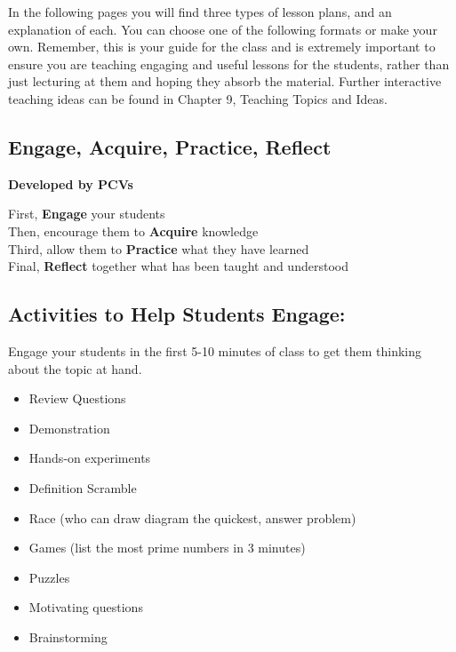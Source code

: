 In the following pages you will find three types of lesson plans, and an explanation of each.  You can choose one of the following formats or make your own.  Remember, this is your guide for the class and is extremely important to ensure you are teaching engaging and useful lessons for the students, rather than just lecturing at them and hoping they absorb the material.  Further interactive teaching ideas can be found in Chapter 9, Teaching Topics and Ideas.


\newpage

\begin{center}
\section{Engage, Acquire, Practice, Reflect}
\textbf{Developed by PCVs} \\
\end{center}

\begin{flushleft}
First, \textbf{Engage} your students \\
Then, encourage them to \textbf{Acquire} knowledge \\
Third, allow them to \textbf{Practice} what they have learned \\
Final, \textbf{Reflect} together what has been taught and understood \\
\end{flushleft}

\subsection{Activities to Help Students Engage:}
Engage your students in the first 5-10 minutes of class to get them thinking about the topic at hand.
\begin{itemize}
 \item Review Questions
 \item Demonstration
 \item Hands-on experiments
 \item Definition Scramble
 \item Race (who can draw diagram the quickest, answer problem)
 \item Games (list the most prime numbers in 3 minutes)
 \item Puzzles
 \item Motivating questions 
 \item Brainstorming
\end{itemize}

